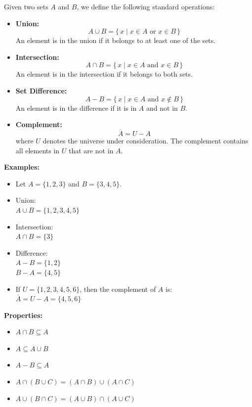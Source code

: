 \documentclass[11pt]{article}
\begin{document}
    Given two sets $A$ and $B$, we define the following standard operations:

    \begin{itemize}
        \item \textbf{Union:}
        \[
            A \cup B = \{\, x \mid x \in A \text{ or } x \in B \,\}
        \]
        An element is in the union if it belongs to at least one of the sets.

        \item \textbf{Intersection:}
        \[
            A \cap B = \{\, x \mid x \in A \text{ and } x \in B \,\}
        \]
        An element is in the intersection if it belongs to both sets.

        \item \textbf{Set Difference:}
        \[
            A - B = \{\, x \mid x \in A \text{ and } x \notin B \,\}
        \]
        An element is in the difference if it is in $A$ and not in $B$.

        \item \textbf{Complement:}
        \[
            \overline{A} = U - A
        \]
        where $U$ denotes the universe under consideration.
        The complement contains all elements in $U$ that are not in $A$.
    \end{itemize}

    \textbf{Examples:}

    \begin{itemize}
        \item Let $A = \{1, 2, 3\}$ and $B = \{3, 4, 5\}$.

        \item Union:\\
        $A \cup B = \{1, 2, 3, 4, 5\}$

        \item Intersection:\\
        $A \cap B = \{3\}$

        \item Difference:\\
        $A - B = \{1, 2\}$\\
        $B - A = \{4, 5\}$

        \item If $U = \{1, 2, 3, 4, 5, 6\}$, then the complement of $A$ is:\\
        $\overline{A} = U - A = \{4, 5, 6\}$
    \end{itemize}

    \textbf{Properties:}
    \begin{itemize}
        \item $A \cap B \subseteq A$
        \item $A \subseteq A \cup B$
        \item $A - B \subseteq A$
        \item $A \cap (B \cup C) = (A \cap B) \cup (A \cap C)$
        \item $A \cup (B \cap C) = (A \cup B) \cap (A \cup C)$
    \end{itemize}
\end{document}
